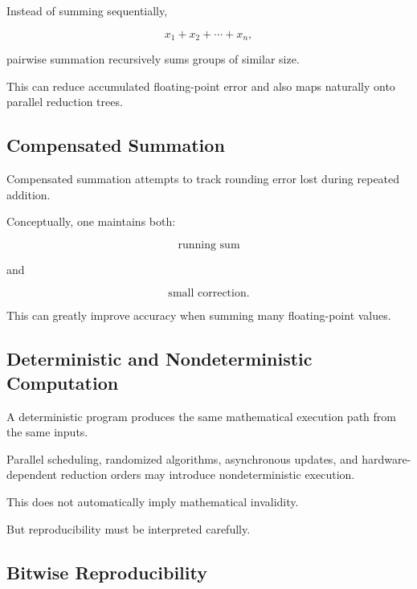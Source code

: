 Instead of summing sequentially,

\[
x_1+x_2+\cdots+x_n,
\]

pairwise summation recursively sums groups of similar size.

This can reduce accumulated floating-point error and also maps naturally
onto parallel reduction trees.

\subsection{Compensated Summation}
\label{subsec:compensated-summation}

Compensated summation attempts to track rounding error lost during repeated
addition.

Conceptually, one maintains both:

\[
\boxed{
\text{running sum}
}
\]

and

\[
\boxed{
\text{small correction}.
}
\]

This can greatly improve accuracy when summing many floating-point values.

\subsection{Deterministic and Nondeterministic Computation}
\label{subsec:deterministic-nondeterministic}

A deterministic program produces the same mathematical execution path from
the same inputs.

Parallel scheduling, randomized algorithms, asynchronous updates, and
hardware-dependent reduction orders may introduce nondeterministic
execution.

This does not automatically imply mathematical invalidity.

But reproducibility must be interpreted carefully.

\subsection{Bitwise Reproducibility}
\label{subsec:bitwise-reproducibility}

